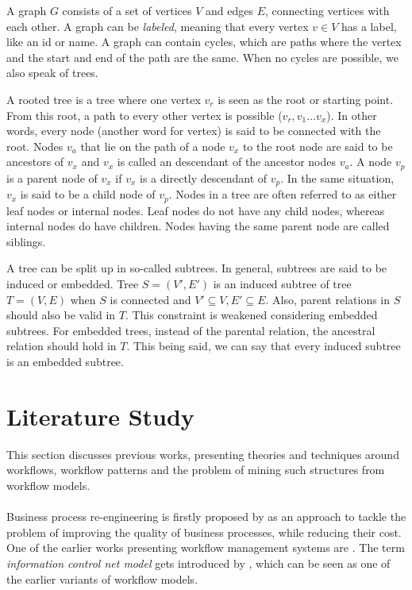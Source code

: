\documentclass[a4paper,11pt]{article}
\begin{document}
\begin{defn}
A graph $G$ consists of a set of vertices $V$ and edges $E$, connecting vertices with each other. A graph can be \textit{labeled}, meaning that every vertex $v \in V$ has a label, like an id or name. A graph can contain cycles, which are paths where the vertex and the start and end of the path are the same. When no cycles are possible, we also speak of trees. 

A rooted tree is a tree where one vertex $v_r$ is seen as the root or starting point. From this root, a path to every other vertex is possible ($v_r, v_1 \ldots v_x$). In other words, every node (another word for vertex) is said to be connected with the root. Nodes $v_a$ that lie on the path of a node $v_x$ to the root node are said to be ancestors of $v_x$ and $v_x$ is called an descendant of the ancestor nodes $v_a$. A node $v_p$ is a parent node of $v_x$ if $v_x$ is a directly descendant of $v_p$. In the same situation, $v_x$ is said to be a child node of $v_p$. Nodes in a tree are often referred to as either leaf nodes or internal nodes. Leaf nodes do not have any child nodes, whereas internal nodes do have children. Nodes having the same parent node are called siblings.
\end{defn}

\begin{defn}[Subtrees]
A tree can be split up in so-called subtrees. In general, subtrees are said to be induced or embedded. Tree $S=(V',E')$ is an induced subtree of tree $T=(V,E)$ when $S$ is connected and $V' \subseteq V, E' \subseteq E$. Also, parent relations in $S$ should also be valid in $T$. This constraint is weakened considering embedded subtrees. For embedded trees, instead of the parental relation, the ancestral relation should hold in $T$. This being said, we can say that every induced subtree is an embedded subtree.
\end{defn}

\section{Literature Study}
\label{section:literature}
This section discusses previous works, presenting theories and techniques around workflows, workflow patterns and the problem of mining such structures from workflow models.\\
\\
Business process re-engineering is firstly proposed by \cite{AutomatingBusinessProcesses1990} as an approach to tackle the problem of improving the quality of business processes, while reducing their cost. One of the earlier works presenting workflow management systems are \cite{OfficeCommunicationsSystem79,OfficeInfoSystem1982}. The term \textit{information control net model} gets introduced by \cite{OfficeInfoSystem1982}, which can be seen as one of the earlier variants of workflow models. 
\end{document}
